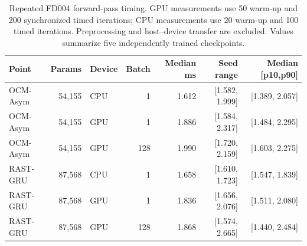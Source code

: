 \begin{table}[!t]
\centering
\scriptsize
\caption{Repeated FD004 forward-pass timing. GPU measurements use 50 warm-up and 200 synchronized timed iterations; CPU measurements use 20 warm-up and 100 timed iterations. Preprocessing and host--device transfer are excluded. Values summarize five independently trained checkpoints.}
\label{tab:inference-latency-protocol}
\begin{tabular}{lrlrrrr}
\toprule
Point & Params & Device & Batch & Median ms & Seed range & Median [p10,p90] \\
\midrule
OCM-Asym & 54,155 & CPU & 1 & 1.612 & [1.582, 1.999] & [1.389, 2.057] \\
OCM-Asym & 54,155 & GPU & 1 & 1.886 & [1.584, 2.317] & [1.484, 2.295] \\
OCM-Asym & 54,155 & GPU & 128 & 1.990 & [1.720, 2.159] & [1.603, 2.275] \\
RAST-GRU & 87,568 & CPU & 1 & 1.658 & [1.610, 1.723] & [1.547, 1.839] \\
RAST-GRU & 87,568 & GPU & 1 & 1.836 & [1.656, 2.076] & [1.511, 2.080] \\
RAST-GRU & 87,568 & GPU & 128 & 1.868 & [1.574, 2.665] & [1.440, 2.484] \\
\bottomrule
\end{tabular}
\end{table}
